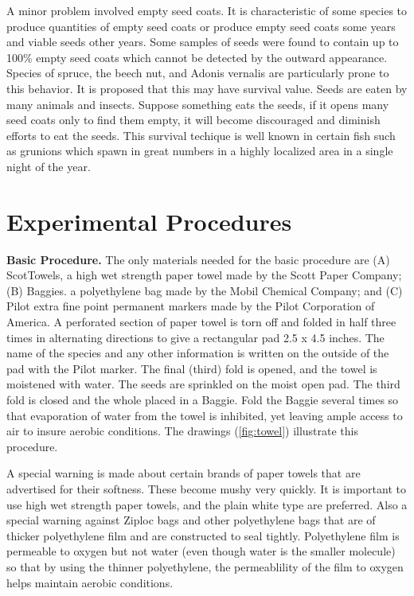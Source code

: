 A minor problem involved empty seed coats. It is characteristic of some species
to produce quantities of empty seed coats or produce empty seed coats some years
and viable seeds other years. Some samples of seeds were found to contain up to
100\% empty seed coats which cannot be detected by the outward appearance.
Species of spruce, the beech nut, and Adonis vernalis are particularly prone to this
behavior. It is proposed that this may have survival value. Seeds are eaten by many
animals and insects. Suppose something eats the seeds, if it opens many seed coats
only to find them empty, it will become discouraged and diminish efforts to eat the
seeds. This survival techique is well known in certain fish such as grunions which
spawn in great numbers in a highly localized area in a single night of the year.

\section{Experimental Procedures}

\textbf{Basic Procedure.} The only materials needed for the basic procedure are (A)
ScotTowels, a high wet strength paper towel made by the Scott Paper Company; (B)
Baggies. a polyethylene bag made by the Mobil Chemical Company; and (C) Pilot
extra fine point permanent markers made by the Pilot Corporation of America. A
perforated section of paper towel is torn off and folded in half three times in alternating
directions to give a rectangular pad 2.5 x 4.5 inches. The name of the species and any
other information is written on the outside of the pad with the Pilot marker. The final
(third) fold is opened, and the towel is moistened with water. The seeds are sprinkled
on the moist open pad. The third fold is closed and the whole placed in a Baggie.
Fold the Baggie several times so that evaporation of water from the towel is inhibited,
yet leaving ample access to air to insure aerobic conditions. The drawings (\ref{fig:towel})
illustrate this procedure.



A special warning is made about certain brands of paper towels that are
advertised for their softness. These become mushy very quickly. It is important to use
high wet strength paper towels, and the plain white type are preferred. Also a special
warning against Ziploc bags and other polyethylene bags that are of thicker
polyethylene film and are constructed to seal tightly. Polyethylene film is permeable to
oxygen but not water (even though water is the smaller molecule) so that by using the
thinner polyethylene, the permeablility of the film to oxygen helps maintain aerobic
conditions.

